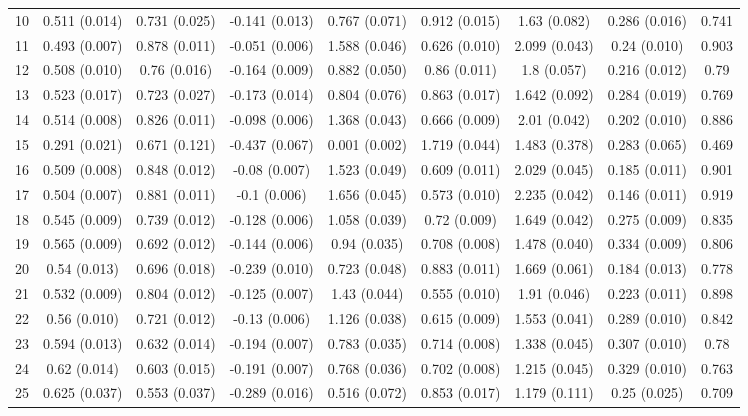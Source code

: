 \begin{tabular}{@{\extracolsep{5pt}} l cccccccc}
10 & 0.511 (0.014) & 0.731 (0.025) & -0.141 (0.013) & 0.767 (0.071) & 0.912 (0.015) & 1.63 (0.082) & 0.286 (0.016) & 0.741 \\ 
11 & 0.493 (0.007) & 0.878 (0.011) & -0.051 (0.006) & 1.588 (0.046) & 0.626 (0.010) & 2.099 (0.043) & 0.24 (0.010) & 0.903 \\ 
12 & 0.508 (0.010) & 0.76 (0.016) & -0.164 (0.009) & 0.882 (0.050) & 0.86 (0.011) & 1.8 (0.057) & 0.216 (0.012) & 0.79 \\ 
13 & 0.523 (0.017) & 0.723 (0.027) & -0.173 (0.014) & 0.804 (0.076) & 0.863 (0.017) & 1.642 (0.092) & 0.284 (0.019) & 0.769 \\ 
14 & 0.514 (0.008) & 0.826 (0.011) & -0.098 (0.006) & 1.368 (0.043) & 0.666 (0.009) & 2.01 (0.042) & 0.202 (0.010) & 0.886 \\ 
15 & 0.291 (0.021) & 0.671 (0.121) & -0.437 (0.067) & 0.001 (0.002) & 1.719 (0.044) & 1.483 (0.378) & 0.283 (0.065) & 0.469 \\ 
16 & 0.509 (0.008) & 0.848 (0.012) & -0.08 (0.007) & 1.523 (0.049) & 0.609 (0.011) & 2.029 (0.045) & 0.185 (0.011) & 0.901 \\ 
17 & 0.504 (0.007) & 0.881 (0.011) & -0.1 (0.006) & 1.656 (0.045) & 0.573 (0.010) & 2.235 (0.042) & 0.146 (0.011) & 0.919 \\ 
18 & 0.545 (0.009) & 0.739 (0.012) & -0.128 (0.006) & 1.058 (0.039) & 0.72 (0.009) & 1.649 (0.042) & 0.275 (0.009) & 0.835 \\ 
19 & 0.565 (0.009) & 0.692 (0.012) & -0.144 (0.006) & 0.94 (0.035) & 0.708 (0.008) & 1.478 (0.040) & 0.334 (0.009) & 0.806 \\ 
20 & 0.54 (0.013) & 0.696 (0.018) & -0.239 (0.010) & 0.723 (0.048) & 0.883 (0.011) & 1.669 (0.061) & 0.184 (0.013) & 0.778 \\ 
21 & 0.532 (0.009) & 0.804 (0.012) & -0.125 (0.007) & 1.43 (0.044) & 0.555 (0.010) & 1.91 (0.046) & 0.223 (0.011) & 0.898 \\ 
22 & 0.56 (0.010) & 0.721 (0.012) & -0.13 (0.006) & 1.126 (0.038) & 0.615 (0.009) & 1.553 (0.041) & 0.289 (0.010) & 0.842 \\ 
23 & 0.594 (0.013) & 0.632 (0.014) & -0.194 (0.007) & 0.783 (0.035) & 0.714 (0.008) & 1.338 (0.045) & 0.307 (0.010) & 0.78 \\ 
24 & 0.62 (0.014) & 0.603 (0.015) & -0.191 (0.007) & 0.768 (0.036) & 0.702 (0.008) & 1.215 (0.045) & 0.329 (0.010) & 0.763 \\ 
25 & 0.625 (0.037) & 0.553 (0.037) & -0.289 (0.016) & 0.516 (0.072) & 0.853 (0.017) & 1.179 (0.111) & 0.25 (0.025) & 0.709 \\ 

\end{tabular}
